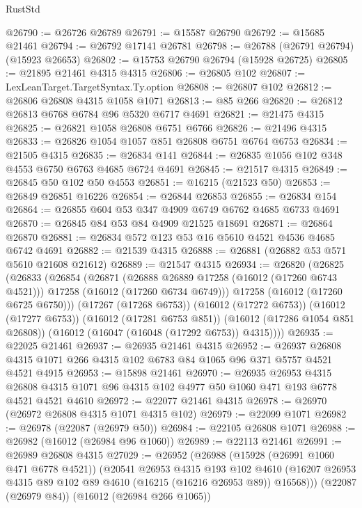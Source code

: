 \begin{lexlean}{RustStd}
\begin{coremodule}
@26790 := @26726 @26789
@26791 := @15587 @26790
@26792 := @15685 @21461
@26794 := @26792 @17141 @26781
@26798 := @26788 (@26791 @26794) (@15923 @26653)
@26802 := @15753 @26790 @26794 (@15928 @26725)
@26805 := @21895 @21461 @4315 @4315
@26806 := @26805 @102
@26807 := LexLeanTarget.TargetSyntax.Ty.option
@26808 := @26807 @102
@26812 := @26806 @26808 @4315 @1058 @1071
@26813 := @85 @266
@26820 := @26812 @26813 @6768 @6784 @96 @5320 @6717 @4691
@26821 := @21475 @4315
@26825 := @26821 @1058 @26808 @6751 @6766
@26826 := @21496 @4315
@26833 := @26826 @1054 @1057 @851 @26808 @6751 @6764 @6753
@26834 := @21505 @4315
@26835 := @26834 @141
@26844 := @26835 @1056 @102 @348 @4553 @6750 @6763 @4685 @6724 @4691
@26845 := @21517 @4315
@26849 := @26845 @50 @102 @50 @4553
@26851 := @16215 (@21523 @50)
@26853 := @26849 @26851 @16226
@26854 := @26844 @26853
@26855 := @26834 @154
@26864 := @26855 @604 @53 @347 @4909 @6749 @6762 @4685 @6733 @4691
@26870 := @26845 @84 @53 @84 @4909 @21525 @18691
@26871 := @26864 @26870
@26881 := @26834 @572 @123 @53 @16 @5610 @4521 @4536 @4685 @6742 @4691
@26882 := @21539 @4315
@26888 := @26881 (@26882 @53 @571 @5610 @21608 @21612)
@26889 := @21547 @4315
@26934 := @26820
    (@26825
      (@26833
        (@26854
          (@26871
            (@26888 @26889 @17258 (@16012 (@17260 @6743 @4521)))
            @17258
            (@16012 (@17260 @6734 @6749)))
          @17258
          (@16012 (@17260 @6725 @6750)))
        (@17267 (@17268 @6753))
        (@16012 (@17272 @6753))
        (@16012 (@17277 @6753))
        (@16012 (@17281 @6753 @851))
        (@16012 (@17286 @1054 @851 @26808))
        (@16012 (@16047 (@16048 (@17292 @6753)) @4315))))
@26935 := @22025 @21461
@26937 := @26935 @21461 @4315
@26952 := @26937 @26808 @4315 @1071 @266 @4315 @102 @6783 @84 @1065 @96 @371 @5757 @4521 @4521 @4915
@26953 := @15898 @21461
@26970 := @26935
    @26953
    @4315
    @26808
    @4315
    @1071
    @96
    @4315
    @102
    @4977
    @50
    @1060
    @471
    @193
    @6778
    @4521
    @4521
    @4610
@26972 := @22077 @21461 @4315
@26978 := @26970 (@26972 @26808 @4315 @1071 @4315 @102)
@26979 := @22099 @1071
@26982 := @26978 (@22087 (@26979 @50))
@26984 := @22105 @26808 @1071
@26988 := @26982 (@16012 (@26984 @96 @1060))
@26989 := @22113 @21461
@26991 := @26989 @26808 @4315
@27029 := @26952
    (@26988
      (@15928 (@26991 @1060 @471 @6778 @4521))
      (@20541
        @26953
        @4315
        @193
        @102
        @4610
        (@16207 @26953 @4315 @89 @102 @89 @4610 (@16215 (@16216 @26953 @89)) @16568)))
    (@22087 (@26979 @84))
    (@16012 (@26984 @266 @1065))

\end{coremodule}
\end{lexlean}
